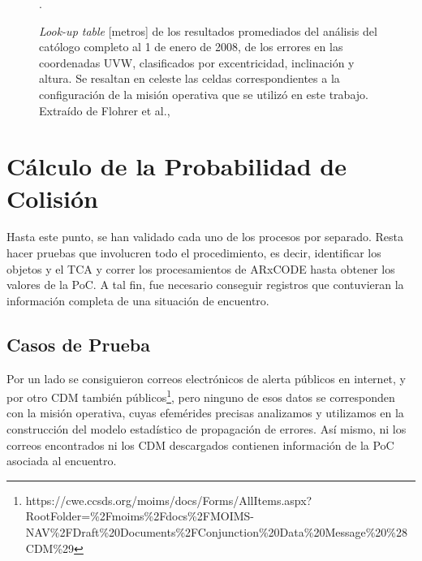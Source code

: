 \begin{figure}[!h]
  \centering
  \caption{{\it{Look-up table}} [metros] de los resultados promediados del an\'alisis del cat\'ologo completo al 1 de enero de 2008, de los errores en las coordenadas UVW, clasificados por excentricidad, inclinaci\'on y altura. Se resaltan en celeste las celdas correspondientes a la configuraci\'on de la misi\'on operativa que se utiliz\'o en este trabajo. Extra\'ido de Flohrer et al., \citep{flohrer2008assessment}}.
  \label{fig:flohrer}
\end{figure}

% 

\section{C\'alculo de la Probabilidad de Colisi\'on}

Hasta este punto, se han validado cada uno de los procesos por separado.
Resta hacer pruebas que involucren todo el procedimiento, es decir, identificar los objetos y el TCA y correr los procesamientos de ARxCODE hasta obtener los valores de la PoC.
A tal fin, fue necesario conseguir registros que contuvieran la informaci\'on completa de una situaci\'on de encuentro.\\

\subsection*{Casos de Prueba}
Por un lado se consiguieron correos electr\'onicos de alerta p\'ublicos en internet, y por otro CDM tambi\'en p\'ublicos\footnote{https://cwe.ccsds.org/moims/docs/Forms/AllItems.aspx?RootFolder=\%2Fmoims\%2Fdocs\%2FMOIMS-NAV\%2FDraft\%20Documents\%2FConjunction\%20Data\%20Message\%20\%28CDM\%29}, pero ninguno de esos datos se corresponden con la misi\'on operativa, cuyas efem\'erides precisas analizamos y utilizamos en la construcci\'on del modelo estad\'istico de propagaci\'on de errores.
As\'i mismo, ni los correos encontrados ni los CDM descargados contienen informaci\'on de la PoC asociada al encuentro. 

